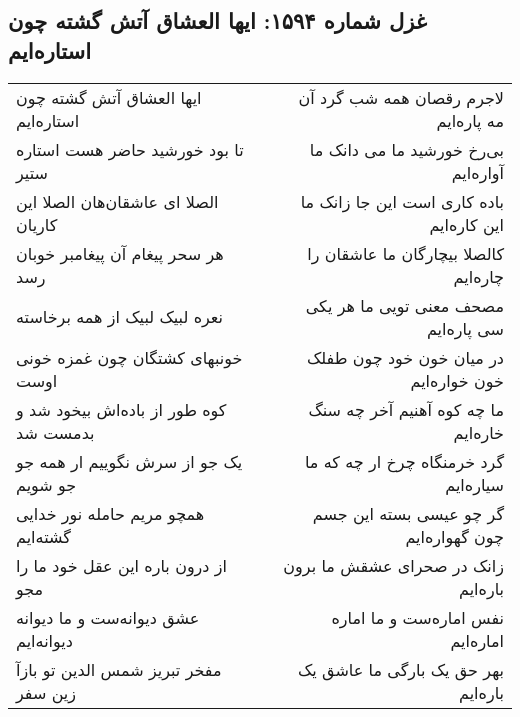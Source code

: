 \begin{center}
\section*{غزل شماره ۱۵۹۴: ایها العشاق آتش گشته چون استاره‌ایم}
\label{sec:1594}
\begin{longtable}{l p{0.5cm} r}
ایها العشاق آتش گشته چون استاره‌ایم
&&
لاجرم رقصان همه شب گرد آن مه پاره‌ایم
\\
تا بود خورشید حاضر هست استاره ستیر
&&
بی‌رخ خورشید ما می دانک ما آواره‌ایم
\\
الصلا ای عاشقان‌هان الصلا این کاریان
&&
باده کاری است این جا زانک ما این کاره‌ایم
\\
هر سحر پیغام آن پیغامبر خوبان رسد
&&
کالصلا بیچارگان ما عاشقان را چاره‌ایم
\\
نعره لبیک لبیک از همه برخاسته
&&
مصحف معنی تویی ما هر یکی سی پاره‌ایم
\\
خونبهای کشتگان چون غمزه خونی اوست
&&
در میان خون خود چون طفلک خون خواره‌ایم
\\
کوه طور از باده‌اش بیخود شد و بدمست شد
&&
ما چه کوه آهنیم آخر چه سنگ خاره‌ایم
\\
یک جو از سرش نگوییم ار همه جو جو شویم
&&
گرد خرمنگاه چرخ ار چه که ما سیاره‌ایم
\\
همچو مریم حامله نور خدایی گشته‌ایم
&&
گر چو عیسی بسته این جسم چون گهواره‌ایم
\\
از درون باره این عقل خود ما را مجو
&&
زانک در صحرای عشقش ما برون باره‌ایم
\\
عشق دیوانه‌ست و ما دیوانه دیوانه‌ایم
&&
نفس اماره‌ست و ما اماره اماره‌ایم
\\
مفخر تبریز شمس الدین تو بازآ زین سفر
&&
بهر حق یک بارگی ما عاشق یک باره‌ایم
\\
\end{longtable}
\end{center}
